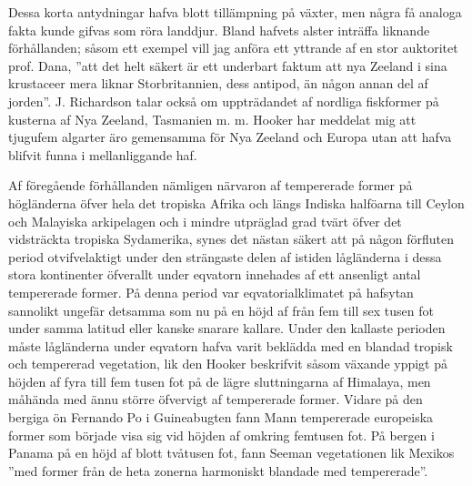 Dessa korta antydningar hafva blott tillämpning på växter, men några få analoga fakta kunde gifvas som röra landdjur. Bland hafvets alster inträffa liknande förhållanden; såsom ett exempel vill jag anföra ett yttrande af en stor auktoritet prof. Dana, ”att det helt säkert är ett underbart faktum att nya Zeeland i sina krustaceer mera liknar Storbritannien, dess antipod, än någon annan del af jorden”. J. Richardson talar också om uppträdandet af nordliga fiskformer på kusterna af Nya Zeeland, Tasmanien m. m. Hooker har meddelat mig att tjugufem algarter äro gemensamma för Nya Zeeland och Europa utan att hafva blifvit funna i mellanliggande haf.

Af föregående förhållanden nämligen närvaron af tempererade former på högländerna öfver hela det tropiska Afrika och längs Indiska halföarna till Ceylon och Malayiska arkipelagen och i mindre utpräglad grad tvärt öfver det vidsträckta tropiska Sydamerika, synes det nästan säkert att på någon förfluten period otvifvelaktigt under den strängaste delen af istiden lågländerna i dessa stora kontinenter öfverallt under eqvatorn innehades af ett ansenligt antal tempererade former. På denna period var eqvatorialklimatet på hafsytan sannolikt ungefär detsamma som nu på en höjd af från fem till sex tusen fot under samma latitud eller kanske snarare kallare. Under den kallaste perioden måste lågländerna under eqvatorn hafva varit beklädda med en blandad tropisk och tempererad vegetation, lik den Hooker beskrifvit såsom växande yppigt på höjden af fyra till fem tusen fot på de lägre sluttningarna af Himalaya, men måhända med ännu större öfvervigt af tempererade former. Vidare på den bergiga ön Fernando Po i Guineabugten fann Mann tempererade europeiska former som började visa sig vid höjden af omkring femtusen fot. På bergen i Panama på en höjd af blott tvåtusen fot, fann Seeman vegetationen lik Mexikos ”med former från de heta zonerna harmoniskt blandade med tempererade”.

